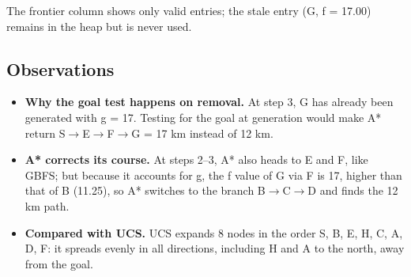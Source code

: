\documentclass[12pt,a4paper]{article}
\providecommand{\tightlist}{\setlength{\itemsep}{0pt}\setlength{\parskip}{0pt}}
\begin{document}
The frontier column shows only valid entries; the stale
entry (G, f = 17.00) remains in the heap but is never used.

\subsection{Observations}

\begin{itemize}
\tightlist
\item
  \textbf{Why the goal test happens on removal.} At step 3,
  G has already been generated with g = 17. Testing for the
  goal at generation would make A* return
  S\(\rightarrow\)E\(\rightarrow\)F\(\rightarrow\)G = 17 km
  instead of 12 km.
\item
  \textbf{A* corrects its course.} At steps 2--3, A* also
  heads to E and F, like GBFS; but because it accounts for
  g, the f value of G via F is 17, higher than that of B
  (11.25), so A* switches to the branch
  B\(\rightarrow\)C\(\rightarrow\)D and finds the 12 km
  path.
\item
  \textbf{Compared with UCS.} UCS expands 8 nodes in the
  order S, B, E, H, C, A, D, F: it spreads evenly in all
  directions, including H and A to the north, away from the
  goal.
\end{itemize}
\end{document}
